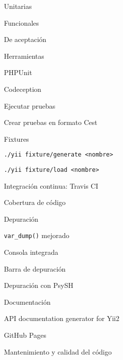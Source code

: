 \begin{longenum}
\begin{longenum}
\begin{longenum}
\begin{longenum}
                \item Unitarias
                \item Funcionales
                \item De aceptación
            \end{longenum}
            \item Herramientas
            \begin{longenum}
                \item PHPUnit \opcional\
                \item Codeception
                \begin{longenum}
                    \item Ejecutar pruebas
                    \item Crear pruebas en formato Cest
                \end{longenum}
                \item Fixtures
                \begin{longenum}
                    \item \texttt{./yii fixture/generate <nombre>}
                    \item \texttt{./yii fixture/load <nombre>}
                \end{longenum}
            \end{longenum}
            \item Integración continua: Travis CI
            \item Cobertura de código \opcional\
        \end{longenum}
        \item Depuración
        \begin{longenum}
            \item \texttt{var\_dump()} mejorado
            \item Consola integrada
            \item Barra de depuración
            \item Depuración con PsySH \opcional\
        \end{longenum}
        \item Documentación
        \begin{longenum}
            \item API documentation generator for Yii2
            \item GitHub Pages
        \end{longenum}
        \item Mantenimiento y calidad del código

\end{longenum}
\end{longenum}
